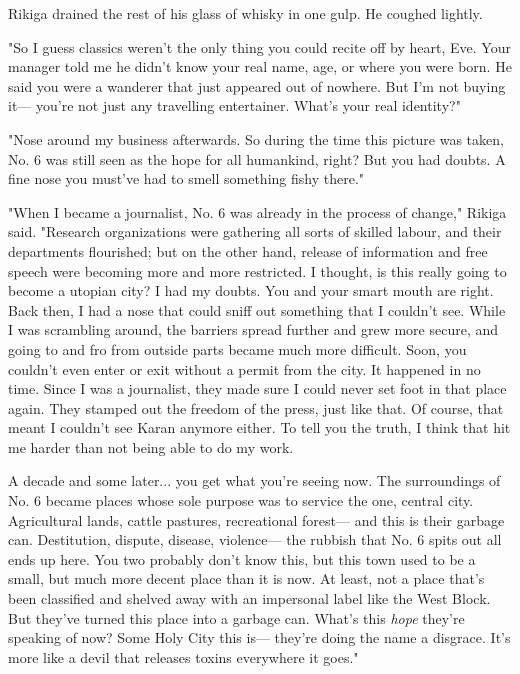Rikiga drained the rest of his glass of whisky in one gulp. He coughed
lightly.

"So I guess classics weren't the only thing you could recite off by
heart, Eve. Your manager told me he didn't know your real name, age, or
where you were born. He said you were a wanderer that just appeared out
of nowhere. But I'm not buying it--- you're not just any travelling
entertainer. What's your real identity?"

"Nose around my business afterwards. So during the time this picture was
taken, No. 6 was still seen as the hope for all humankind, right? But
you had doubts. A fine nose you must've had to smell something fishy
there."

"When I became a journalist, No. 6 was already in the process of
change," Rikiga said. "Research organizations were gathering all sorts
of skilled labour, and their departments flourished; but on the other
hand, release of information and free speech were becoming more and more
restricted. I thought, is this really going to become a utopian city? I
had my doubts. You and your smart mouth are right. Back then, I had a
nose that could sniff out something that I couldn't see. While I was
scrambling around, the barriers spread further and grew more secure, and
going to and fro from outside parts became much more difficult. Soon,
you couldn't even enter or exit without a permit from the city. It
happened in no time. Since I was a journalist, they made sure I could
never set foot in that place again. They stamped out the freedom of the
press, just like that. Of course, that meant I couldn't see Karan
anymore either. To tell you the truth, I think that hit me harder than
not being able to do my work.

A decade and some later... you get what you're seeing now. The
surroundings of No. 6 became places whose sole purpose was to service
the one, central city. Agricultural lands, cattle pastures, recreational
forest--- and this is their garbage can. Destitution, dispute, disease,
violence--- the rubbish that No. 6 spits out all ends up here. You two
probably don't know this, but this town used to be a small, but much
more decent place than it is now. At least, not a place that's been
classified and shelved away with an impersonal label like the West
Block. But they've turned this place into a garbage can. What's this
\emph{hope} they're speaking of now? Some Holy City this is--- they're doing the
name a disgrace. It's more like a devil that releases toxins everywhere
it goes."


